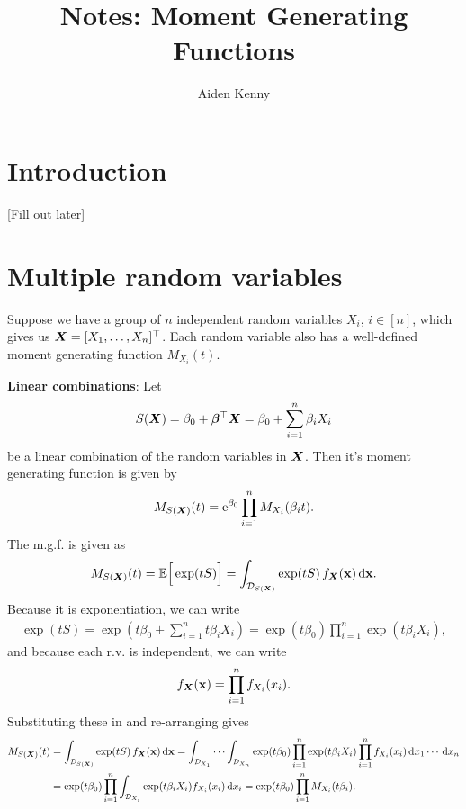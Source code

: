 \documentclass[10pt]{article}
\begin{document}
\title{Notes: Moment Generating Functions}
\author{Aiden Kenny}
\maketitle

\section{Introduction}

[Fill out later]

\section{Multiple random variables}

Suppose we have a group of \( n \) independent random variables \( X_i \), \( i \in [n] \),
which gives us
\( \bm{X} = [X_1, \ldots, X_n]^{\top} \).
Each random variable also has a well-defined moment generating function \( M_{X_i}(t) \).

\vspace*{2em}\noindent
\textbf{Linear combinations}:
Let
\begin{align*}
    S(\rVector{X})
    = \beta_0 + \mVector{\beta}^\top \rVector{X}
    = \beta_0 + \sum_{i=1}^n \beta_i X_i
\end{align*}
be a linear combination of the random variables in \( \bm{X} \).
Then it's moment generating function is given by
\begin{align}
    M_{S(\bm{X})}(t)
    = \mathrm{e}^{\beta_0} \prod_{i=1}^n M_{X_i}(\beta_i t).
\end{align}
The m.g.f. is given as
\begin{align*}
    M_{S(\rVector{X})}(t)
    = \ev\Big[ \exp(t S) \Big]
    = \int_{\mathcal{D}_{S(\rVector{X})}}
    \exp(t S)
    \, f_{\rVector{X}}(\mVector{x})
    \, \mathrm{d}\mVector{x}.
\end{align*}
Because it is exponentiation,
we can write
\begin{align*}
    \exp(t S)
    = \exp \left( t \beta_0 + \sum_{i = 1}^n t \beta_i X_i \right)
    = \exp(t \beta_0) \prod_{i=1}^{n} \exp(t \beta_i X_i),
\end{align*}
and because each r.v. is independent, we can write
\begin{align*}
    f_{\rVector{X}}(\mVector{x})
    = \prod_{i=1}^{n} f_{X_i}(x_i).
\end{align*}
Substituting these in and re-arranging gives
\begin{align*}
    M_{S(\rVector{X})}(t)
    &= \int_{\mathcal{D}_{S(\rVector{X})}}
    \exp(t S)
    \, f_{\rVector{X}}(\mVector{x})
    \, \mathrm{d}\mVector{x}
    = \int_{\mathcal{D}_{X_1}} \cdots \int_{\mathcal{D}_{X_n}}
    \exp(t \beta_0) \prod_{i=1}^{n} \exp(t \beta_i X_i)
    \prod_{i=1}^{n} f_{X_i}(x_i)
    \, \mathrm{d}x_1
    \cdots
    \, \mathrm{d}x_n \\
    &= \exp(t \beta_0)
    \prod_{i=1}^{n}
    \int_{\mathcal{D}_{X_i}}
    \exp(t \beta_i X_i)
    f_{X_i}(x_i)
    \, \mathrm{d}x_i
    = \exp(t \beta_0)
    \prod_{i=1}^{n}
    M_{X_i}(t \beta_i).
\end{align*}
\end{document}

